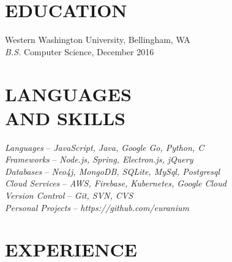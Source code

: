 \documentclass[line,margin]{res}
\begin{document}
\address{360.931.3237 $|$ rainierharvey@gmail.com $|$ nulldev.ninja $|$ github.com/euranium}

\begin{resume}

\section{EDUCATION}
	{\sf Western Washington University}, Bellingham, WA \\
	{\sl B.S.} Computer Science, { December 2016} \\

\section{LANGUAGES\\AND SKILLS}
	{\sl Languages} -- {\sl JavaScript, Java, Google Go, Python, C}\\
	{\sl Frameworks} -- {\sl Node.js, Spring, Electron.js, jQuery} \\
	{\sl Databases} -- {\sl Neo4j, MongoDB, SQLite, MySql, Postgresql} \\
	{\sl Cloud Services} -- {\sl AWS, Firebase, Kubernetes, Google Cloud} \\
	{\sl Version Control} -- {\sl Git, SVN, CVS}\\
	{\sl Personal Projects} -- {\sl https://github.com/euranium}\\

\section{EXPERIENCE}


\end{resume}
\end{document}
